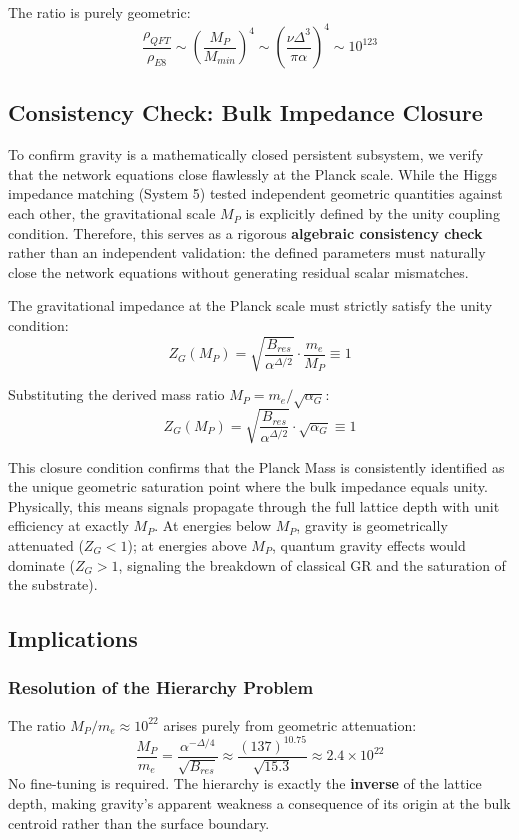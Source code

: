 The ratio is purely geometric:
\begin{equation}
    \frac{\rho_{QFT}}{\rho_{E8}} \sim \left(\frac{M_P}{M_{min}}\right)^4 
    \sim \left(\frac{\nu\Delta^3}{\pi\alpha}\right)^4 
    \sim 10^{123}
\end{equation}

\subsection{Consistency Check: Bulk Impedance Closure}
To confirm gravity is a mathematically closed persistent subsystem, we verify that the network equations close flawlessly at the Planck scale. While the Higgs impedance matching (System 5) tested independent geometric quantities against each other, the gravitational scale $M_P$ is explicitly defined by the unity coupling condition. Therefore, this serves as a rigorous \textbf{algebraic consistency check} rather than an independent validation: the defined parameters must naturally close the network equations without generating residual scalar mismatches.

The gravitational impedance at the Planck scale must strictly satisfy the unity condition:
\begin{equation}
Z_G(M_P) = \sqrt{\frac{B_{res}}{\alpha^{\Delta/2}}} \cdot \frac{m_e}{M_P} \equiv 1
\end{equation}

Substituting the derived mass ratio $M_P = m_e / \sqrt{\alpha_G}$:
\begin{equation}
Z_G(M_P) = \sqrt{\frac{B_{res}}{\alpha^{\Delta/2}}} \cdot \sqrt{\alpha_G} \equiv 1
\end{equation}

This closure condition confirms that the Planck Mass is consistently identified as the unique geometric saturation point where the bulk impedance equals unity. Physically, this means signals propagate through the full lattice depth with unit efficiency at exactly $M_P$. At energies below $M_P$, gravity is geometrically attenuated ($Z_G < 1$); at energies above $M_P$, quantum gravity effects would dominate ($Z_G > 1$, signaling the breakdown of classical GR and the saturation of the substrate).

\subsection{Implications}

\subsubsection{Resolution of the Hierarchy Problem}
The ratio $M_P/m_e \approx 10^{22}$ arises purely from geometric attenuation:
\begin{equation}
\frac{M_P}{m_e} = \frac{\alpha^{-\Delta/4}}{\sqrt{B_{res}}} \approx \frac{(137)^{10.75}}{\sqrt{15.3}} \approx 2.4 \times 10^{22}
\end{equation}
No fine-tuning is required. The hierarchy is exactly the \textbf{inverse} of the lattice depth, making gravity's apparent weakness a consequence of its origin at the bulk centroid rather than the surface boundary.

